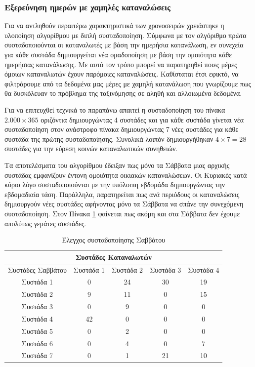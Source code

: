 \subsubsection{Εξερεύνηση ημερών με χαμηλές καταναλώσεις}
Για να αντληθούν περαιτέρω χαρακτηριστικά των χρονοσειρών χρειάστηκε η υλοποίηση αλγορίθμου με διπλή συσταδοποίηση. Σύμφωνα με τον αλγόριθμο πρώτα συσταδοποιούνται οι καταναλωτές με βάση την ημερήσια κατανάλωση, εν συνεχεία για κάθε συστάδα δημιουργείται νέα ομαδοποίηση με βάση την ομοιότητα κάθε ημερήσιας κατανάλωσης. Με αυτό τον τρόπο μπορεί να παρατηρηθεί ποιες μέρες όμοιων καταναλωτών έχουν παρόμοιες καταναλώσεις. Καθίσταται έτσι εφικτό, να φιλτράρουμε από τα δεδομένα μας μέρες με χαμηλή κατανάλωση που γνωρίζουμε πως θα δυσκόλευαν το πρόβλημα της ταξινόμησης σε αληθή και αλλοιωμένα δεδομένα.\par
Για να επιτευχθεί τεχνικά το παραπάνω απαιτεί η συσταδοποίηση του πίνακα $2.000 \times 365$ οριζόντια δημιουργώντας 4 συστάδες και για κάθε συστάδα γίνεται νέα συσταδοποίηση στον ανάστροφο πίνακα δημιουργώντας 7 νέες συστάδες για κάθε συστάδα της πρώτης συσταδοποίησης. Συνολικά λοιπόν δημιουργήθηκαν $4 \times 7 = 28$ συστάδες για την εύρεση κοινών καταναλωτικών συνηθειών.\par
Τα αποτελέσματα του αλγορίθμου έδειξαν πως μόνο τα Σάββατα μιας αρχικής συστάδας εμφανίζουν έντονη ομοιότητα οικιακών καταναλώσεων. Οι Κυριακές κατά κύριο λόγο συσταδοποιούνται με την υπόλοιπη εβδομάδα δημιουργώντας την εβδομαδιαία τάση. Παράλληλα, παρατηρείται πως ανά περιόδους οι καταναλώσεις δημιουργούν νέες συστάδες αφήνοντας μόνο τα Σάββατα να σπάνε την συνεχόμενη συσταδοποίηση. Στον Πίνακα \ref{tab:double clustering} φαίνεται πως ακόμη και στα Σάββατα δεν έχουμε απολύτως γεμάτες συστάδες.

\begin{table}[ht!]
\centering
\begin{tabular}{ |c||c|c|c|c|  }
 \hline
 \multicolumn{5}{|c|}{Συστάδες Καταναλωτών} \\
 \hline
 Συστάδες Σαββάτου  & Συστάδα 1& Συστάδα 2 &Συστάδα 3 &Συστάδα 4\\
 \hline
 Συστάδα 1 & 0  & 24 & 30 & 19\\
 Συστάδα 2 & 9  & 11 & 0  & 15\\
 Συστάδα 3 & 0  & 9  & 0  & 0\\
 Συστάδα 4 & 42 & 0  & 0  & 0\\
 Συστάδα 5 & 0  & 2  & 0  & 0\\
 Συστάδα 6 & 0  & 4  & 0  & 7\\
 Συστάδα 7 & 0  & 1  & 21 & 10\\
 \hline
\end{tabular}
\caption{Έλεγχος συσταδοποίησης Σαββάτου}
\label{tab:double clustering}
\end{table}

